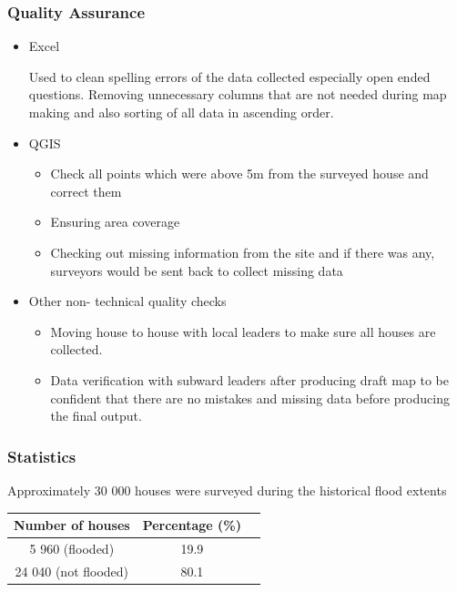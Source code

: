 \documentclass[a4paper,12pt,twoside]{article}
\begin{document}
\subsubsection{Quality Assurance}
    \begin{itemize}
    \item Excel
    \
    
     Used  to clean spelling errors of the data collected especially open ended questions. Removing unnecessary columns that are not needed during map making and also sorting of all data in ascending order.
    \item QGIS
        \begin{itemize}
             \item Check all points which  were above 5m from the surveyed house and correct them
            \item Ensuring area coverage
            \item Checking out missing information from the site and if there was any, surveyors would be sent back to collect missing data
        \end{itemize}
    \item Other non- technical quality checks
        \begin{itemize}
            \item Moving house to house with local leaders to make sure all houses are collected.
            \item Data verification with subward leaders after producing draft map to be confident that there are no mistakes and missing data before producing the final output.
        \end{itemize}
    \end{itemize}

\subsubsection{Statistics}
Approximately 30 000 houses were surveyed during the historical flood extents

\begin{center}    
\begin{tabular}{|c|c|c|}
\hline
Number of houses & Percentage (\%)\\
\hline
5 960 (flooded) & 19.9\\
24 040 (not flooded) & 80.1\\
\hline
\end{tabular}
\end{center}
\end{document}

